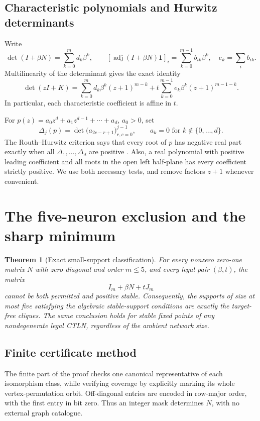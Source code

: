 \documentclass[11pt,a4paper]{article}
\newtheorem{theorem}{Theorem}[section]
\theoremstyle{definition}\newtheorem{definition}[theorem]{Definition}
\theoremstyle{remark}\newtheorem{remark}[theorem]{Remark}
\newcommand{\ones}{\mathbf{1}}
\newcommand{\adj}{\operatorname{adj}}
\begin{document}
\subsection{Characteristic polynomials and Hurwitz determinants}
Write
\begin{equation}\label{eq:dv}
 \det(I+\beta N)=\sum_{k=0}^m d_k\beta^k,
 \qquad [\adj(I+\beta N)\ones]_i=\sum_{k=0}^{m-1}b_{ik}\beta^k,
 \quad e_k=\sum_i b_{ik}.
\end{equation}
Multilinearity of the determinant gives the exact identity
\begin{equation}\label{eq:characteristic}
 \det(zI+K)=
 \sum_{k=0}^{m}d_k\beta^k(z+1)^{m-k}
 +t\sum_{k=0}^{m-1}e_k\beta^k(z+1)^{m-1-k}.
\end{equation}
In particular, each characteristic coefficient is affine in $t$.

For $p(z)=a_0z^d+a_1z^{d-1}+\cdots+a_d$, $a_0>0$, set
\begin{equation}\label{eq:hurwitz}
 \Delta_j(p)=\det\bigl(a_{2c-r+1}\bigr)_{r,c=0}^{j-1},
 \qquad a_k=0\text{ for }k\notin\{0,\ldots,d\}.
\end{equation}
The Routh--Hurwitz criterion says that every root of $p$ has negative real part exactly when all $\Delta_1,\ldots,\Delta_d$ are positive \cite{Gantmacher}. Also, a real polynomial with positive leading coefficient and all roots in the open left half-plane has every coefficient strictly positive. We use both necessary tests, and remove factors $z+1$ whenever convenient.

\section{The five-neuron exclusion and the sharp minimum}\label{sec:minimum}
\begin{theorem}[Exact small-support classification]\label{thm:small}
For every nonzero zero-one matrix $N$ with zero diagonal and order $m\leq5$, and every legal pair $(\beta,t)$, the matrix
\[
 I_m+\beta N+tJ_m
\]
cannot be both permitted and positive stable. Consequently, the supports of size at most five satisfying the algebraic stable-support conditions are exactly the target-free cliques. The same conclusion holds for stable fixed points of any nondegenerate legal CTLN, regardless of the ambient network size.
\end{theorem}

\subsection{Finite certificate method}
The finite part of the proof checks one canonical representative of each isomorphism class, while verifying coverage by explicitly marking its whole vertex-permutation orbit. Off-diagonal entries are encoded in row-major order, with the first entry in bit zero. Thus an integer mask determines $N$, with no external graph catalogue.
\end{document}
